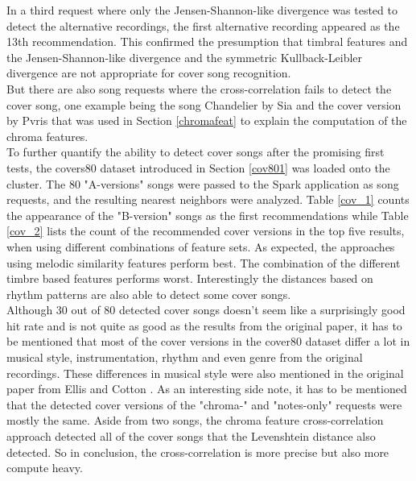 \noindent %
In a third request where only the Jensen-Shannon-like divergence was tested to detect the alternative recordings, the first alternative recording appeared as the 13th recommendation. This confirmed the presumption that timbral features and the Jensen-Shannon-like divergence and the symmetric Kullback-Leibler divergence are not appropriate for cover song recognition.\\
\noindent But there are also song requests where the cross-correlation fails to detect the cover song, one example being the song Chandelier by Sia and the cover version by Pvris that was used in Section \ref{chromafeat} to explain the computation of the chroma features.\\
\noindent To further quantify the ability to detect cover songs after the promising first tests, the covers80 dataset introduced in Section \ref{cov801} was loaded onto the cluster. The 80 "A-versions" songs were passed to the Spark application as song requests, and the resulting nearest neighbors were analyzed. Table \ref{cov_1} counts the appearance of the "B-version" songs as the first recommendations while Table \ref{cov_2} lists the count of the recommended cover versions in the top five results, when using different combinations of feature sets. As expected, the approaches using melodic similarity features perform best. The combination of the different timbre based features performs worst. Interestingly the distances based on rhythm patterns are also able to detect some cover songs.\\
\noindent Although 30 out of 80 detected cover songs doesn't seem like a surprisingly good hit rate and is not quite as good as the results from the original paper, it has to be mentioned that most of the cover versions in the cover80 dataset differ a lot in musical style, instrumentation, rhythm and even genre from the original recordings. These differences in musical style were also mentioned in the original paper from Ellis and Cotton \cite[p. 3]{cover802}.
\noindent As an interesting side note, it has to be mentioned that the detected cover versions of the "chroma-" and "notes-only" requests were mostly the same. Aside from two songs, the chroma feature cross-correlation approach detected all of the cover songs that the Levenshtein distance also detected. So in conclusion, the cross-correlation is more precise but also more compute heavy.

